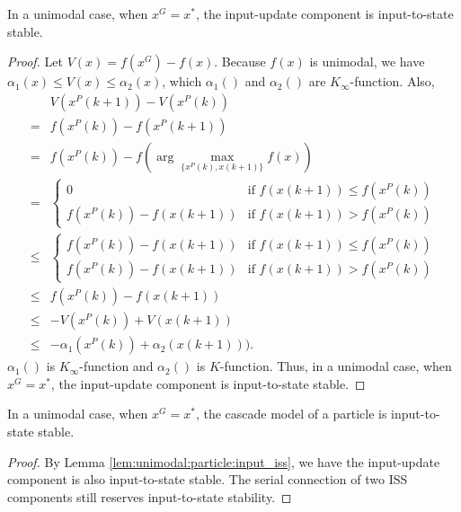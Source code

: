 \begin{mylem}
\label{lem:unimodal:particle:input_iss}
In a unimodal case, when $ x^{G} = x^{*} $, the input-update component is input-to-state stable.
\begin{proof}
Let $ V(x) = f(x^{G}) - f(x) $.
Because $ f(x) $ is unimodal, we have
$ \alpha_{1} (x) \leq V(x) \leq \alpha_{2} (x)  $, 
which $ \alpha_{1} () $ and $ \alpha_{2} () $ are $ K_{\infty} $-function.
Also,
\begin{equation}
\begin{aligned}
& V(x^{P}(k+1)) - V(x^{P}(k)) \\
= & f(x^{P} (k)) - f(x^{P} (k+1)) \\
= & f(x^{P}(k)) - f( \arg \max_{ \{ x^{P}(k), x(k+1)  \} } f(x) )  \\
= & 
\left\{\begin{matrix}
0  & \mbox{if } f(x(k+1)) \leq f(x^{P}(k)) \\ 
f(x^{P}(k)) - f(x(k+1)) & \mbox{if } f(x(k+1)) > f(x^{P}(k))
\end{matrix}\right. \\
\leq & 
\left\{\begin{matrix}
f(x^{P}(k)) - f(x(k+1))  & \mbox{if } f(x(k+1)) \leq f(x^{P}(k)) \\ 
f(x^{P}(k)) - f(x(k+1)) & \mbox{if } f(x(k+1)) > f(x^{P}(k))
\end{matrix}\right. \\
\leq & f(x^{P}(k)) - f(x(k+1)) \\
\leq & - V(x^{P}(k)) + V(x(k+1)) \\
\leq & - \alpha_{1} ( x^{P}(k) ) + \alpha_{2} (x(k+1))).
\end{aligned}
\end{equation} 
$ \alpha_{1} () $ is $ K_{\infty} $-function and $ \alpha_{2} () $ is $ K $-function.
Thus, in a unimodal case, when $ x^{G} = x^{*} $, the input-update component is input-to-state stable.
\end{proof}
\end{mylem}

\begin{mylem}
\label{lem:unimodal:particle:iss}
In a unimodal case, when $ x^{G} = x^{*} $, the cascade model of a particle is input-to-state stable.
\begin{proof}
By Lemma \ref{lem:unimodal:particle:input_iss}, we have the input-update component is also input-to-state stable.
The serial connection of two ISS components still reserves input-to-state stability.
\end{proof}
\end{mylem}

